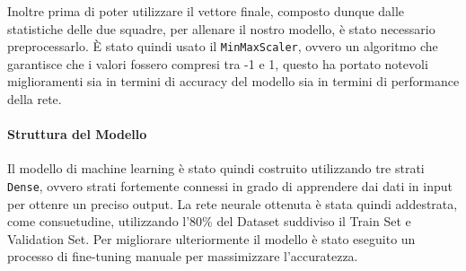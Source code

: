 \documentclass[a4paper]{article}
\numberwithin{equation}{section}
\begin{document}
Inoltre prima di poter utilizzare il vettore finale, composto dunque dalle statistiche delle due squadre, per allenare il nostro modello, è stato necessario preprocessarlo. È stato quindi usato il \texttt{MinMaxScaler}, ovvero un algoritmo che garantisce che i valori fossero compresi tra -1 e 1, questo ha portato notevoli miglioramenti sia in termini di accuracy del modello sia in termini di performance della rete.

\paragraph{Struttura del Modello}
Il modello di machine learning è stato quindi costruito utilizzando tre strati \texttt{Dense}, ovvero strati fortemente connessi in grado di apprendere dai dati in input per ottenre un preciso output. La rete neurale ottenuta è stata quindi addestrata, come consuetudine, utilizzando l'80\% del Dataset suddiviso il Train Set e Validation Set.
Per migliorare ulteriormente il modello è stato eseguito un processo di fine-tuning manuale per massimizzare l'accuratezza.
\end{document}
